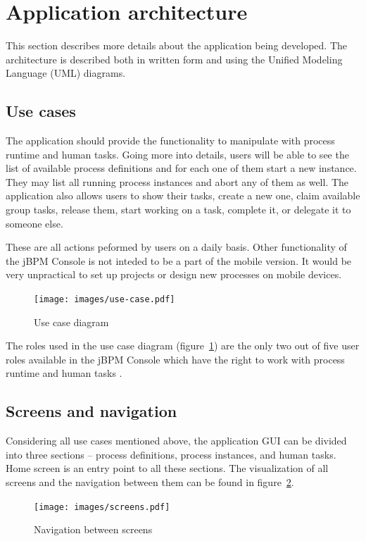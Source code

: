 \documentclass[12pt,oneside,final]{fithesis2}
\begin{document}
\section{Application architecture}
This section describes more details about the application being developed.
The architecture is described both in written form and using the Unified Modeling Language (UML) diagrams.

\subsection{Use cases}
The application should provide the functionality to manipulate with process runtime and human tasks.
Going more into details, users will be able to see the list of available process definitions and for each one of them start a new instance.
They may list all running process instances and abort any of them as well.
The application also allows users to show their tasks, create a new one, claim available group tasks, release them, start working on a task, complete it, or delegate it to someone else.

These are all actions peformed by users on a daily basis.
Other functionality of the jBPM Console is not inteded to be a part of the mobile version.
It would be very unpractical to set up projects or design new processes on mobile devices.

\begin{figure}[ht!]
\centering
\texttt{[image: images/use-case.pdf]}
\caption{Use case diagram}
\label{fig:use-case}
\end{figure}

The roles used in the use case diagram (figure~\ref{fig:use-case}) are the only two out of five user roles available in the jBPM Console which have the right to work with process runtime and human tasks \cite{jbpm6roles}.

\subsection{Screens and navigation}
Considering all use cases mentioned above, the application GUI can be divided into three sections -- process definitions, process instances, and human tasks.
Home screen is an entry point to all these sections.
The visualization of all screens and the navigation between them can be found in figure~\ref{fig:screens}.

\begin{figure}[ht!]
\centering
\texttt{[image: images/screens.pdf]}
\caption{Navigation between screens}
\label{fig:screens}
\end{figure}
\end{document}

